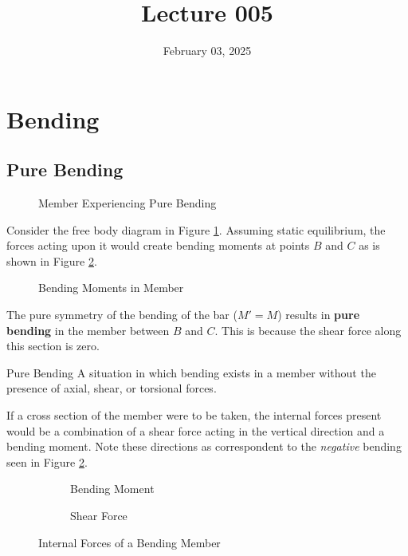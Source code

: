 \documentclass[12pt]{article}
\title{Lecture 005}
\date{February 03, 2025}
\begin{document}
\newpage
\section{Bending}
\label{sec:bending}

\subsection{Pure Bending}
\label{ssec:pureBending}

\begin{figure}[H]
  \centering
  
  \caption{Member Experiencing Pure Bending}
  \label{fig:057}
\end{figure}

Consider the free body diagram in Figure \ref{fig:057}. Assuming static equilibrium, the forces acting upon it would create bending moments at points $B$ and $C$ as is shown in Figure \ref{fig:058}.

\begin{figure}[H]
  \centering
  
  \caption{Bending Moments in Member}
  \label{fig:058}
\end{figure}

The pure symmetry of the bending of the bar ($M' = M$) results in \textbf{pure bending} in the member between $B$ and $C$. This is because the shear force along this section is zero.

\begin{definition}{Pure Bending}
  A situation in which bending exists in a member without the presence of axial, shear, or torsional forces.
\end{definition}

If a cross section of the member were to be taken, the internal forces present would be a combination of a shear force acting in the vertical direction and a bending moment. Note these directions as correspondent to the \textit{negative} bending seen in Figure \ref{fig:058}.
\begin{figure}[H]
  \centering
  \begin{subfigure}[H]{0.45\textwidth}
    \centering
    
    \caption{Bending Moment}
    \label{fig:060}
  \end{subfigure}
  \begin{subfigure}[H]{0.45\textwidth}
    \centering
    
    \caption{Shear Force}
    \label{fig:059}
  \end{subfigure}
  \caption{Internal Forces of a Bending Member}
  \label{fig:internalForcesOfABendingMember}
\end{figure}
\end{document}

